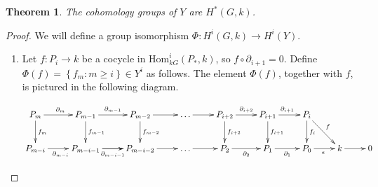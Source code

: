 \documentclass[12pt]{article}
\newtheorem{theorem}[definition]{Theorem}
\begin{document}
\begin{theorem}
The cohomology groups of $Y$ are $H^\ast\left(G,k\right)$.
\end{theorem}
\begin{proof}
We will define a group isomorphism
$\Phi:H^i\left(G,k\right)\to H^i\left(Y\right)$.
\begin{enumerate}
\item Let $f:P_i\to k$ be a cocycle
in $\mathrm{Hom}_{kG}^i\left(P_\ast,k\right)$,
so $f\circ\partial_{i+1}=0$.
Define $\Phi\left(f\right)=
\left\{f_m:m\ge i\right\}\in Y^i$ as follows.
The element $\Phi\left(f\right)$, together with $f$, is pictured
in the following diagram.

\begin{equation}\label{pff}\xymatrix{
P_m\ar[r]^{\partial_m}\ar[d]^{f_m}
&P_{m-1}\ar[d]^{f_{m-1}}\ar[r]^{\partial_{m-1}}
&P_{m-2}\ar[d]^{f_{m-2}}\ar[r]
&\dots\ar[r]
&P_{i+2}\ar[r]^{\partial_{i+2}}\ar[d]^{f_{i+2}}
&P_{i+1}\ar[r]^{\partial_{i+1}}\ar[d]^{f_{i+1}}
&P_i\ar[d]^{f_i}\ar[dr]^f
\\
P_{m-i}\ar[r]_{\partial_{m-i}}
&P_{m-i-1}\ar[r]\ar[r]_{\partial_{m-i-1}}
&P_{m-i-2}\ar[r]
&\dots\ar[r]
&P_2\ar[r]_{\partial_2}
&P_1\ar[r]_{\partial_1}
&P_0\ar[r]_\epsilon&k\ar[r]&0
}\end{equation}


\end{enumerate}
\end{proof}
\end{document}
